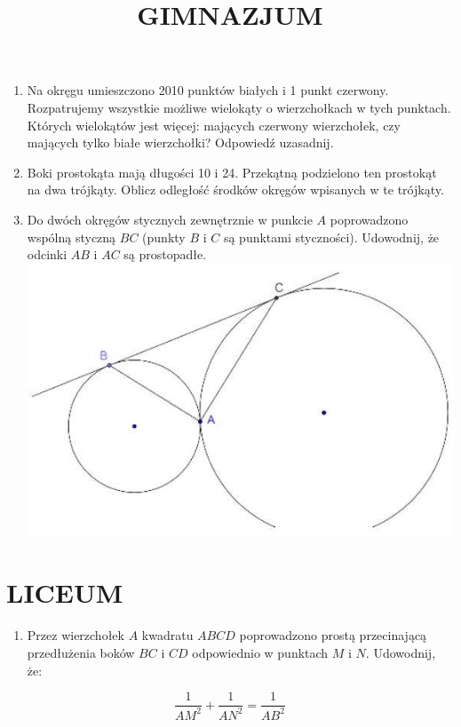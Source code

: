 \documentclass[10pt]{article}
\title{GIMNAZJUM }
\author{}
\date{}
\begin{document}
\maketitle
\begin{enumerate}
  \item Na okręgu umieszczono 2010 punktów białych i 1 punkt czerwony. Rozpatrujemy wszystkie możliwe wielokąty o wierzchołkach w tych punktach. Których wielokątów jest więcej: mających czerwony wierzchołek, czy mających tylko białe wierzchołki? Odpowiedź uzasadnij.
  \item Boki prostokąta mają długości 10 i 24. Przekątną podzielono ten prostokąt na dwa trójkąty. Oblicz odległość środków okręgów wpisanych w te trójkąty.
  \item Do dwóch okręgów stycznych zewnętrznie w punkcie \(A\) poprowadzono wspólną styczną \(B C\) (punkty \(B\) i \(C\) są punktami styczności). Udowodnij, że odcinki \(A B\) i \(A C\) są prostopadłe.\\
\includegraphics[max width=\textwidth, center]{2024_11_21_bbb3d86d6b5f62b4382ag-1}
\end{enumerate}

\section*{LICEUM}
\begin{enumerate}
  \item Przez wierzchołek \(A\) kwadratu \(A B C D\) poprowadzono prostą przecinającą przedłużenia boków \(B C\) i \(C D\) odpowiednio w punktach \(M\) i \(N\). Udowodnij, że:
\end{enumerate}

\[
\frac{1}{A M^{2}}+\frac{1}{A N^{2}}=\frac{1}{A B^{2}}
\]
\end{document}
